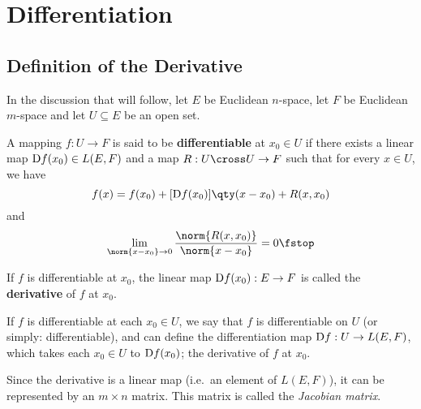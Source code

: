 \chapter{Differentiation}
\section{Definition of the Derivative}
In the discussion that will follow, let \( E \) be Euclidean \( n \)-space, let \( F \) be Euclidean \( m \)-space and let \( U\subseteq E \) be an open set.
\begin{definition}
  A mapping \( f:U\to F \) is said to be \textbf{differentiable} at \( x_0\in U \) if there exists a linear map \( \text{D} f(x_0)\in L(E,F) \) and a map \( R:U\cross U\to F \) such that for every \( x\in U \), we have
  \[ f(x)=f(x_0)+[\D f(x_0)]\qty(x-x_0)+R(x,x_0) \]
  and
  \[ \lim_{\norm{x-x_0}\to 0}\frac{\norm{R(x,x_0)}}{\norm{x-x_0}}=0\fstop \]

  If \( f \) is differentiable at \( x_0 \), the linear map \( \text{D} f(x_0):E\to F \) is called the \textbf{derivative} of \( f \) at \( x_0 \).
\end{definition}

If \( f \) is differentiable at each \( x_0\in U \), we say that \( f \) is differentiable on \( U \) (or simply: differentiable), and can define the differentiation map \( \text{D} f:U\to L(E,F) \), which takes each \( x_0\in U \) to \( \text{D} f(x_0) \); the derivative of \( f \) at \( x_0 \).

\vspace{3mm}

Since the derivative is a linear map (i.e.\ an element of \( L(E,F) \)), it can be represented by an \( m\times n \) matrix. This matrix is called the \emph{Jacobian matrix}.

